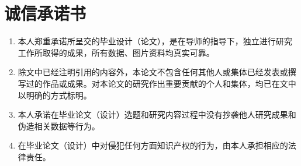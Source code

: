 \chapter*{诚信承诺书}
\label{chap:honest}

\begin{enumerate}
\item 本人郑重承诺所呈交的毕业设计（论文），是在导师的指导下，独立进行研究工作所取得的成果，所有数据、图片资料均真实可靠。
\item 除文中已经注明引用的内容外，本论文不包含任何其他人或集体已经发表或撰写过的作品或成果。对本论文的研究作出重要贡献的个人和集体，均已在文中以明确的方式标明。
\item 本人承诺在毕业论文（设计）选题和研究内容过程中没有抄袭他人研究成果和伪造相关数据等行为。
\item 在毕业论文（设计）中对侵犯任何方面知识产权的行为，由本人承担相应的法律责任。
\end{enumerate}

\baselineskip


